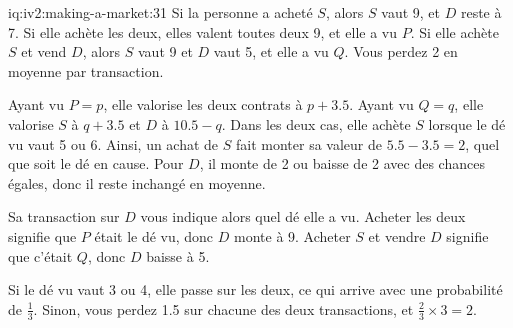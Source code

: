 \begin{solution}{iq:iv2:making-a-market:31}
Si la personne a acheté $S$, alors $S$ vaut 9, et $D$ reste à 7. Si elle achète les deux, elles valent toutes deux 9, et elle a vu $P$. Si elle achète $S$ et vend $D$, alors $S$ vaut 9 et $D$ vaut 5, et elle a vu $Q$. Vous perdez 2 en moyenne par transaction.

Ayant vu $P = p$, elle valorise les deux contrats à $p + 3.5$. Ayant vu $Q = q$, elle valorise $S$ à $q + 3.5$ et $D$ à $10.5 - q$. Dans les deux cas, elle achète $S$ lorsque le dé vu vaut 5 ou 6. Ainsi, un achat de $S$ fait monter sa valeur de $5.5 - 3.5 = 2$, quel que soit le dé en cause. Pour $D$, il monte de 2 ou baisse de 2 avec des chances égales, donc il reste inchangé en moyenne.

Sa transaction sur $D$ vous indique alors quel dé elle a vu. Acheter les deux signifie que $P$ était le dé vu, donc $D$ monte à 9. Acheter $S$ et vendre $D$ signifie que c'était $Q$, donc $D$ baisse à 5.

Si le dé vu vaut 3 ou 4, elle passe sur les deux, ce qui arrive avec une probabilité de $\tfrac13$. Sinon, vous perdez 1.5 sur chacune des deux transactions, et $\tfrac23 \times 3 = 2$.

\end{solution}

